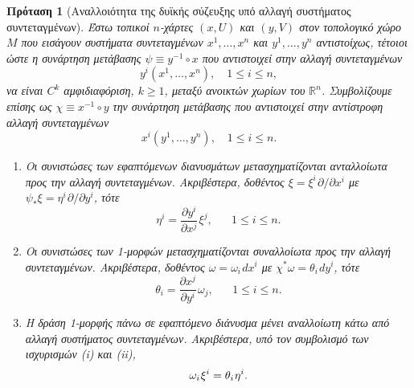 \documentclass[11pt,a4paper,twoside,openright]{book}
\newtheorem{proposition}[lemma]{Πρόταση}
\begin{document}
\begin{proposition}[Αναλλοιότητα της δυϊκής σύζευξης υπό αλλαγή συστήματος συντεταγμένων]
	\label{prop:elementary-contravariance-covariance}
Έστω τοπικοί $n$-χάρτες $(x, U)$ και $(y, V)$
στον τοπολογικό χώρο $M$ που εισάγουν συστήματα συντεταγμένων
$x^1, \dots, x^n$ και $y^1, \dots, y^n$ αντιστοίχως,
τέτοιοι ώστε η συνάρτηση μετάβασης
$\psi \equiv y^{-1} \circ x$ που αντιστοιχεί στην αλλαγή συντεταγμένων
\begin{equation*}
y^i(x^1, \dots, x^n),
\quad
1 \le i \le n,
\end{equation*}
να είναι $C^k$ αμφιδιαφόριση, $k \ge 1$, μεταξύ ανοικτών χωρίων του $\mathbb{R}^n$.
Συμβολίζουμε επίσης ως $\chi \equiv x^{-1} \circ y$
την συνάρτηση μετάβασης που αντιστοιχεί στην αντίστροφη
αλλαγή συντεταγμένων
\begin{equation*}
x^i(y^1, \dots, y^n),
\quad
1 \le i \le n.
\end{equation*}
\begin{enumerate}[label=(\roman*), leftmargin=0pt, itemindent=*, align=left]
    \item[\textup{(i)}]
    	Οι συνιστώσες των εφαπτόμενων διανυσμάτων μετασχηματίζονται
    	ανταλλοίωτα προς την αλλαγή συντεταγμένων.
    	Ακριβέστερα, δοθέντος $\xi = \xi^i \hspace{1pt} \partial/\partial x^i$ με $\psi_* \xi = \eta^i \hspace{1pt} \partial/\partial y^i$, τότε
    	\begin{equation}\label{eq:prop-elementary-covariance-1}
    	\eta^i =
    	\frac{\partial y^i}{\partial x^j} \hspace{1pt} \xi^j,
    	\quad
    	\, \, \, \, 1 \le i \le n.
    	\end{equation}
    \item[\textup{(ii)}]
    	Οι συνιστώσες των 1-μορφών μετασχηματίζονται συναλλοίωτα προς την αλλαγή συντεταγμένων. Ακριβέστερα, δοθέντος $\omega = \omega_i \hspace{1pt} dx^i$ με
    	$\chi^* \omega = \theta_i \hspace{1pt} dy^i$, τότε
		\begin{equation}\label{eq:prop-elementary-covariance-2}
			\theta_i = \frac{\partial x^j}{\partial y^i} \hspace{1pt} \omega_j,
			\quad
			\, \, \, \, 1 \le i \le n.
		\end{equation}
	\item[\textup{(iii)}]
		Η δράση 1-μορφής πάνω σε εφαπτόμενο διάνυσμα μένει αναλλοίωτη κάτω από αλλαγή συστήματος συντεταγμένων.
		Ακριβέστερα, υπό τον συμβολισμό των ισχυρισμών \textup{(i)} και \textup{(ii)},
		\begin{equation}
			\omega_i \hspace{.5pt} \xi^i = \theta_i \hspace{.5pt} \eta^i.
		\end{equation}
\end{enumerate}
\end{proposition}
\end{document}
